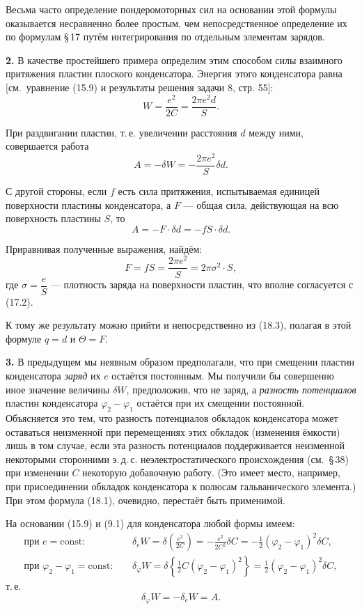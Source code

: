\documentclass[a4paper,10pt]{article}
\begin{document}
Весьма часто определение пондеромоторных сил на основании этой
формулы оказывается несравненно более простым, чем непосредственное
определение их по формулам §\,17 путём интегрирования по отдельным
элементам зарядов.

\textbf{2.} В качестве простейшего примера определим этим способом
силы взаимного притяжения пластин плоского конденсатора. Энергия
этого конденсатора равна [см.\ уравнение (15.9) и результаты решения
задачи 8, стр. 55]:
$$
    W = \frac{e^2}{2C} = \frac{2\pi e^2 d}{S}.
$$

При раздвигании пластин, т.\,е. увеличении расстояния $d$ между
ними, совершается работа
$$
    A = -\delta W = -\frac{2\pi e^2}{S}\delta d.
$$

С другой стороны, если $f$ есть сила притяжения, испытываемая
единицей поверхности пластины конденсатора, а $F$ — общая сила,
действующая на всю поверхность пластины $S$, то
$$
    A = -F\cdot\delta d = -fS\cdot\delta d.
$$


Приравнивая полученные выражения, найдём:
$$
    F = fS = \frac{2\pi e^2}{S} = 2\pi\sigma^2\cdot S,
$$
где $\sigma = \dfrac{e}{S}$ — плотность заряда на поверхности пластин,
что вполне согласуется с (17.2).

К тому же результату можно прийти и непосредственно из (18.3),
полагая в этой формуле $q = d$ и $\Theta = F$.

\textbf{3.} В предыдущем мы неявным образом предполагали, что при
смещении пластин конденсатора \textit{заряд} их $e$ остаётся
постоянным. Мы получили бы совершенно иное значение величины $\delta W$,
предположив, что не заряд, а \textit{разность потенциалов} пластин
конденсатора $\varphi_2 - \varphi_1$ остаётся при их смещении
постоянной. Объясняется это тем, что разность потенциалов обкладок
конденсатора может оставаться неизменной при перемещениях этих обкладок
(изменения ёмкости) лишь в том случае, если эта разность потенциалов
поддерживается неизменной некоторыми сторонними э.\,д.\,с.
неэлектростатического происхождения (см.\ §\,38) при изменении $C$
некоторую добавочную работу. (Это имеет место, например, при
присоединении обкладок конденсатора к полюсам гальванического
элемента.) При этом формула (18.1), очевидно, перестаёт быть применимой.

На основании (15.9) и (9.1) для конденсатора любой формы имеем:
\begin{align*}
    \text{при } e = \text{const}: \quad
    &\delta_e W = \delta\!\left(\frac{e^2}{2C}\right)
               = -\frac{e^2}{2C^2}\delta C
               = -\frac{1}{2}(\varphi_2 - \varphi_1)^2\delta C, \\
    \text{при } \varphi_2 - \varphi_1 = \text{const}: \quad
    &\delta_\varphi W = \delta\!\left\{\frac{1}{2}C(\varphi_2 - \varphi_1)^2\right\}
               = \frac{1}{2}(\varphi_2 - \varphi_1)^2\delta C,
\end{align*}
т.\,е.
\begin{equation}
    \delta_\varphi W = -\delta_e W = A.
    \tag{18.4}
\end{equation}
\end{document}
